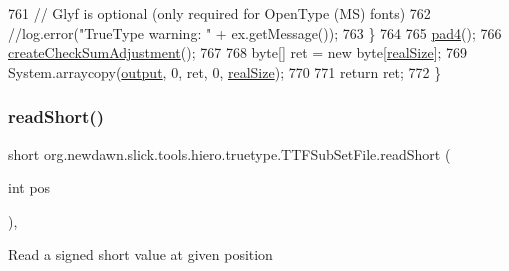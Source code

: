 \begin{DoxyCode}
761             \textcolor{comment}{// Glyf is optional (only required for OpenType (MS) fonts)}
762             \textcolor{comment}{//log.error("TrueType warning: " + ex.getMessage());}
763         \}
764 
765         \mbox{\hyperlink{classorg_1_1newdawn_1_1slick_1_1tools_1_1hiero_1_1truetype_1_1_t_t_f_sub_set_file_a0c2daa792c418ab2f19378ed0189e713}{pad4}}();
766         \mbox{\hyperlink{classorg_1_1newdawn_1_1slick_1_1tools_1_1hiero_1_1truetype_1_1_t_t_f_sub_set_file_a4e488d6cb27400de20b0a21592e55701}{createCheckSumAdjustment}}();
767 
768         byte[] ret = \textcolor{keyword}{new} byte[\mbox{\hyperlink{classorg_1_1newdawn_1_1slick_1_1tools_1_1hiero_1_1truetype_1_1_t_t_f_sub_set_file_afbd6781b24988e94a488596aa954ee3c}{realSize}}];
769         System.arraycopy(\mbox{\hyperlink{classorg_1_1newdawn_1_1slick_1_1tools_1_1hiero_1_1truetype_1_1_t_t_f_sub_set_file_a967f26c7cbd2c428f7ca96c4958edded}{output}}, 0, ret, 0, \mbox{\hyperlink{classorg_1_1newdawn_1_1slick_1_1tools_1_1hiero_1_1truetype_1_1_t_t_f_sub_set_file_afbd6781b24988e94a488596aa954ee3c}{realSize}});
770 
771         \textcolor{keywordflow}{return} ret;
772     \}
\end{DoxyCode}
\mbox{\label{classorg_1_1newdawn_1_1slick_1_1tools_1_1hiero_1_1truetype_1_1_t_t_f_sub_set_file_a861f6d91c147573d61018bd6f2697eb9}} 
\subsubsection{\texorpdfstring{read\+Short()}{readShort()}}
{\footnotesize\ttfamily short org.\+newdawn.\+slick.\+tools.\+hiero.\+truetype.\+T\+T\+F\+Sub\+Set\+File.\+read\+Short (\begin{DoxyParamCaption}\item[{int}]{pos }\end{DoxyParamCaption})\hspace{0.3cm}{\ttfamily [inline]}, {\ttfamily [private]}}

Read a signed short value at given position


